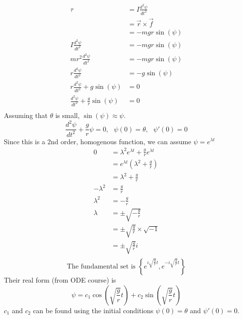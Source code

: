 \documentclass[
	date={August 26{,} 2024}
]{math486notes}
\begin{document}
\begin{example}
	\begin{equation*}
	\begin{aligned}
		\tau &= I\frac{d^{2}\psi}{dt^{2}}\\
			 &= \vec{r}\times\vec{f}\\
			 &= -mgr\sin(\psi)\\
		I\frac{d^{2}\psi}{dt^{2}} &= -mgr\sin(\psi)\\
		mr^{2}\frac{d^{2}\psi}{dt^{2}} &= -mgr\sin(\psi)\\
		r\frac{d^{2}\psi}{dt^{2}} &= -g\sin(\psi)\\
		r\frac{d^{2}\psi}{dt^{2}} + g\sin(\psi) &= 0\\
		\frac{d^{2}\psi}{dt^{2}} + \frac{g}{r}\sin(\psi) &= 0\\
	\end{aligned}
	\end{equation*}
	Assuming that $\theta$ is small, $\sin(\psi)\approx\psi$.
	\[ \frac{d^{2}\psi}{dt^{2}} + \frac{g}{r}\psi = 0,\ \ \ \psi(0) = \theta,\ \ \ \psi'(0) = 0 \]
	Since this is a 2nd order, homogenous function, we can assume $\psi=e^{\lambda t}$
	\begin{equation*}
	\begin{aligned}
		0 &= \lambda^{2}e^{\lambda t} + \frac{g}{r}e^{\lambda t}\\
		  &= e^{\lambda t}\left( \lambda^{2} + \frac{g}{r} \right)\\
		  &= \lambda^{2} + \frac{g}{r}\\
		-\lambda^{2} &= \frac{g}{r}\\
		\lambda^{2} &= -\frac{g}{r}\\
		\lambda &= \pm\sqrt{-\frac{g}{r}}\\
				&= \pm\sqrt{\frac{g}{r}}\times\sqrt{-1}\\
				&= \pm\sqrt{\frac{g}{r}}i\\
	\end{aligned}
	\end{equation*}
	\[ \mbox{The fundamental set is } \left\{ e^{i\sqrt{\frac{g}{r}}t}, e^{-i\sqrt{\frac{g}{r}}t} \right\} \]
	Their real form (from ODE course) is
	\begin{equation}
		\psi = c_{1}\cos\left( \sqrt{\frac{g}{r}}t \right) + c_{2}\sin\left( \sqrt{\frac{g}{r}}t \right)
		\label{eq:real}
	\end{equation}
	$c_{1}$ and $c_{2}$ can be found using the initial conditions $\psi(0) = \theta$ and $\psi'(0) = 0$.
	\begin{equation*}
	\begin{aligned}

\end{aligned}
\end{equation*}
\end{example}
\end{document}
